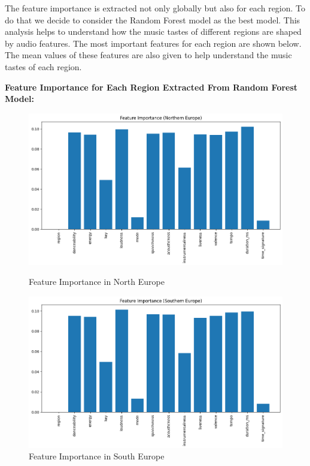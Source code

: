The feature importance is extracted not only globally but also for each region. To do that we decide to consider the Random Forest model as the best model.
This analysis helps to understand how the music tastes of different regions are shaped by audio features.
The most important features for each region are shown below. The mean values of these features are also given to help understand the music tastes of each region.


\textbf{Feature Importance for Each Region Extracted From Random Forest Model:}
\begin{figure}[h]
    \centering
    \begin{minipage}{0.45\textwidth}
        \centering
        \includegraphics[width=\linewidth]{media/rf_feature_imp_northen_europe.png}
        \caption{Feature Importance in North Europe}
    \end{minipage}%
    \hspace{0.05\textwidth} %
    \begin{minipage}{0.45\textwidth}
        \centering
        \includegraphics[width=\linewidth]{media/rf_feature_imp_southern_europe.png}
        \caption{Feature Importance in South Europe}
    \end{minipage}
\end{figure}
